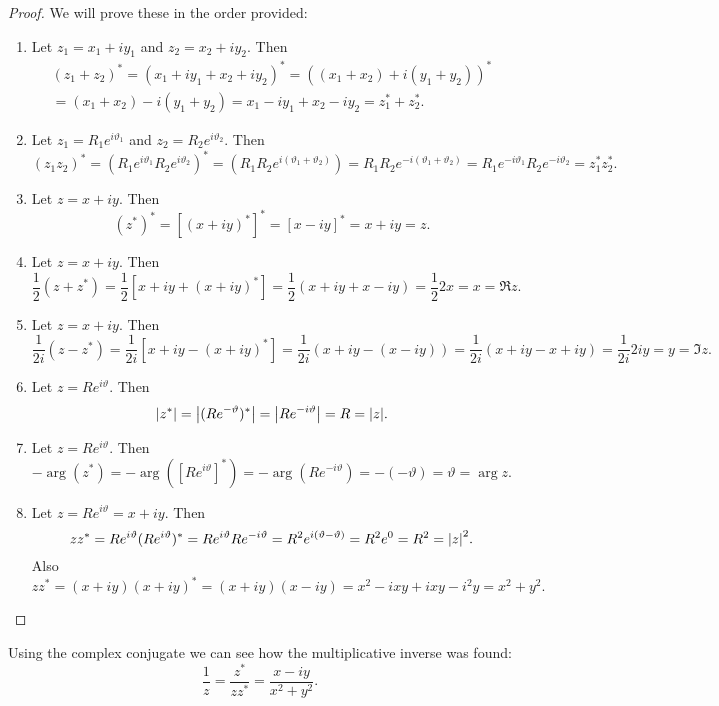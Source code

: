 \documentclass{article}
\begin{document}
    \begin{proof}
        We will prove these in the order provided:
        \begin{enumerate}
            \item Let \(z_1 = x_1 + iy_1\) and \(z_2 = x_2 + iy_2\).
            Then
            \begin{multline*}
                (z_1 + z_2)^* = (x_1 + iy_1 + x_2 + iy_2)^* = ((x_1 + x_2) + i(y_1 + y_2))^* \\= (x_1 + x_2) - i(y_1 + y_2) = x_1 - iy_1 + x_2 - iy_2 = z_1^* + z_2^*.
            \end{multline*}
            
            \item Let \(z_1 = R_1e^{i\vartheta_1}\) and \(z_2 = R_2e^{i\vartheta_2}\).
            Then
            \[(z_1z_2)^* = (R_1e^{i\vartheta_1}R_2e^{i\vartheta_2})^* = (R_1R_2e^{i(\vartheta_1 + \vartheta_2)}) = R_1R_2e^{-i(\vartheta_1 + \vartheta_2)} = R_1e^{-i\vartheta_1}R_2e^{-i\vartheta_2} = z_1^*z_2^*.\]
            
            \item Let \(z = x + iy\).
            Then
            \[(z^*)^* = [(x + iy)^*]^* = [x - iy]^* = x + iy = z.\]
            
            \item Let \(z = x + iy\).
            Then
            \[\frac{1}{2}(z + z^*) = \frac{1}{2}[x + iy + (x + iy)^*] = \frac{1}{2}(x + iy + x - iy) = \frac{1}{2}2x = x = \Re z.\]
            
            \item Let \(z = x + iy\).
            Then
            \[\frac{1}{2i}(z - z^*) = \frac{1}{2i}[x + iy - (x + iy)^*] = \frac{1}{2i}(x + iy - (x - iy)) = \frac{1}{2i}(x + iy - x + iy) = \frac{1}{2i}2iy = y = \Im z.\]
            
            \item Let \(z = Re^{i\vartheta}\).
            Then
            \[\abs{z^*} = \abs{(Re^{-\vartheta})^*} = \abs{Re^{-i\vartheta}} = R = \abs{z}.\]
            
            \item Let \(z = Re^{i\vartheta}\).
            Then
            \[-\arg (z^*) = -\arg([Re^{i\vartheta}]^*) = -\arg(Re^{-i\vartheta}) = -(-\vartheta) = \vartheta = \arg z.\]
            
            \item Let \(z = Re^{i\vartheta} = x + iy\).
            Then
            \[zz^* = Re^{i\vartheta}(Re^{i\vartheta})^* = Re^{i\vartheta}Re^{-i\vartheta} = R^2e^{i(\vartheta - \vartheta)} = R^2e^0 = R^2 = \abs{z}^2.\]
            Also
            \[zz^* = (x + iy)(x + iy)^* = (x + iy)(x - iy) = x^2 - ixy + ixy - i^2y = x^2 + y^2.\]
        \end{enumerate}
    \end{proof}
    Using the complex conjugate we can see how the multiplicative inverse was found:
    \[\frac{1}{z} = \frac{z^*}{zz^*} = \frac{x - iy}{x^2 + y^2}.\]
    
\end{document}
